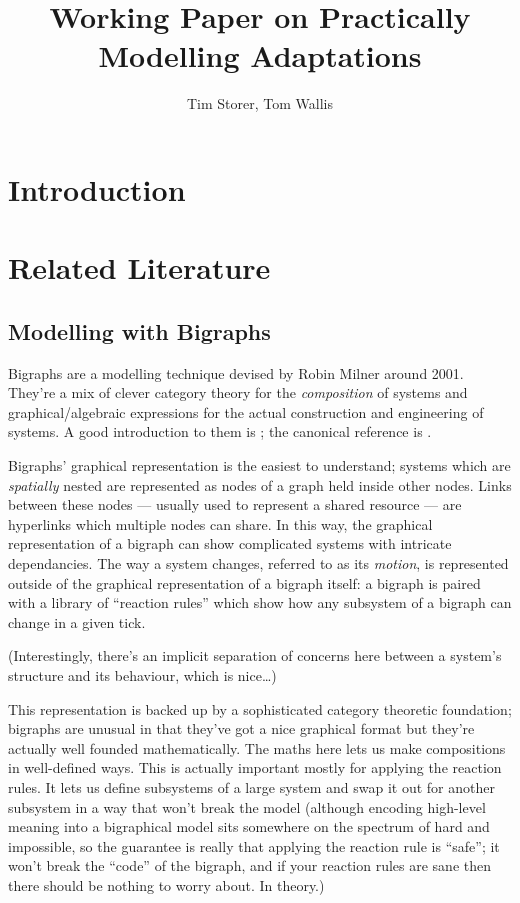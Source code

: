 \documentclass{article}
\title{Working Paper on Practically Modelling Adaptations}
\author{Tim Storer, Tom Wallis}
\begin{document}
\section{Introduction}

\section{Related Literature}

\subsection{Modelling with Bigraphs}

Bigraphs are a modelling technique devised by Robin Milner around 2001. They're a mix of clever category theory for the
\emph{composition} of systems and graphical/algebraic expressions for the actual construction and engineering of
systems. A good introduction to them is \cite{milner:bigraphsandtheiralgebra}; the canonical reference is
\cite{milner:spaceandmotion}.\par

Bigraphs' graphical representation is the easiest to understand; systems which are \emph{spatially} nested are
represented as nodes of a graph held inside other nodes. Links between these nodes --- usually used to represent a
shared resource --- are hyperlinks which multiple nodes can share. In this way, the graphical representation of a
bigraph can show complicated systems with intricate dependancies. The way a system changes, referred to as its
\emph{motion}, is represented outside of the graphical representation of a bigraph itself: a bigraph is paired with a
library of ``reaction rules'' which show how any subsystem of a bigraph can change in a given tick.\par

(Interestingly, there's an implicit separation of concerns here between a system's structure and its behaviour, which is
nice\ldots{})\par

This representation is backed up by a sophisticated category theoretic foundation; bigraphs are unusual in that they've
got a nice graphical format but they're actually well founded mathematically. The maths here lets us make compositions
in well-defined ways. This is actually important mostly for applying the reaction rules. It lets us define subsystems of
a large system and swap it out for another subsystem in a way that won't break the model (although encoding high-level
meaning into a bigraphical model sits somewhere on the spectrum of hard and impossible, so the guarantee is really that
applying the reaction rule is ``safe''; it won't break the ``code'' of the bigraph, and if your reaction rules are sane
then there should be nothing to worry about. In theory.)\par
\end{document}
